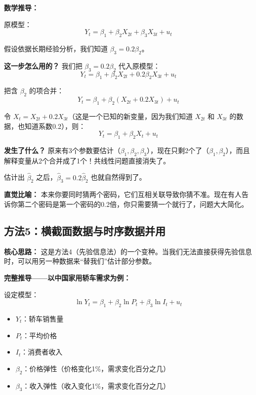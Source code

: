 \documentclass[12pt,a4paper]{ctexart}
\begin{document}
\textbf{数学推导：}

原模型：
\begin{equation}
Y_t = \beta_1 + \beta_2 X_{2t} + \beta_3 X_{3t} + u_t \tag{4.24}
\end{equation}

假设依据长期经验分析，我们知道 $\beta_3 = 0.2\beta_2$。

\textbf{这一步怎么用的？} 我们把 $\beta_3 = 0.2\beta_2$ 代入原模型：
\[
Y_t = \beta_1 + \beta_2 X_{2t} + 0.2\beta_2 X_{3t} + u_t
\]

把含 $\beta_2$ 的项合并：
\[
Y_t = \beta_1 + \beta_2(X_{2t} + 0.2X_{3t}) + u_t
\]

令 $X_t = X_{2t} + 0.2X_{3t}$（这是一个已知的新变量，因为我们知道 $X_{2t}$ 和 $X_{3t}$ 的数据，也知道系数0.2），则：
\begin{equation}
Y_t = \beta_1 + \beta_2 X_t + u_t \tag{4.25}
\end{equation}

\textbf{发生了什么？} 原来有3个参数要估计（$\beta_1, \beta_2, \beta_3$），现在只剩2个了（$\beta_1, \beta_2$），而且解释变量从2个合并成了1个！共线性问题直接消失了。

估计出 $\hat{\beta}_2$ 之后，$\hat{\beta}_3 = 0.2\hat{\beta}_2$ 也就自然得到了。

\textbf{直觉比喻：} 本来你要同时猜两个密码，它们互相关联导致你猜不准。现在有人告诉你第二个密码是第一个密码的0.2倍，你只需要猜一个就行了，问题大大简化。

\subsection{方法5：横截面数据与时序数据并用}

\textbf{核心思路：} 这是方法4（先验信息法）的一个变种。当我们无法直接获得先验信息时，可以用另一种数据来“替我们”估计部分参数。

\textbf{完整推导——以中国家用轿车需求为例：}

设定模型：
\begin{equation}
\ln Y_t = \beta_1 + \beta_2 \ln P_t + \beta_3 \ln I_t + u_t \tag{4.26}
\end{equation}
\begin{itemize}
\item $Y_t$：轿车销售量
\item $P_t$：平均价格
\item $I_t$：消费者收入
\item $\beta_2$：价格弹性（价格变化1\%，需求变化百分之几）
\item $\beta_3$：收入弹性（收入变化1\%，需求变化百分之几）
\end{itemize}
\end{document}
